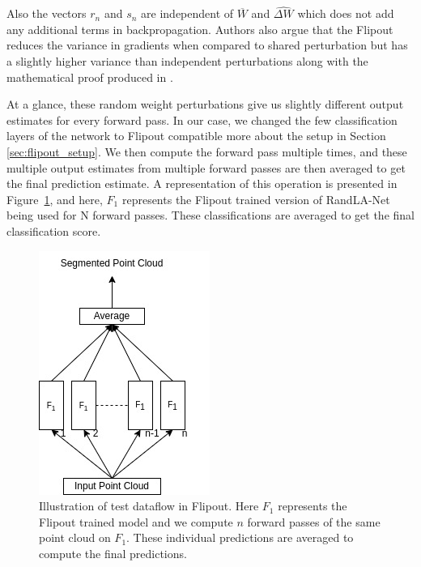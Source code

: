 Also the vectors $r_n$ and $s_n$ are independent of $\overline{W}$ and $\widehat{\Delta W}$ which does not add any additional terms in backpropagation.
Authors also argue that the Flipout reduces the variance in gradients when compared to shared perturbation but has a slightly higher variance than independent perturbations along with the mathematical proof produced in \cite{Flipout}.


At a glance, these random weight perturbations give us slightly different output estimates for every forward pass.
In our case, we changed the few classification layers of the network to Flipout compatible more about the setup in Section \ref{sec:flipout_setup}.
We then compute the forward pass multiple times, and these multiple output estimates from multiple forward passes are then averaged to get the final prediction estimate.
A representation of this operation is presented in Figure~\ref{fig:flipout_ex}, and here, $F_1$ represents the Flipout trained version of RandLA-Net being used for N forward passes.
These classifications are averaged to get the final classification score.

\begin{figure}
    \centering
    \includegraphics[scale=0.5]{images/flipout.jpg}
    \caption{Illustration of test dataflow in Flipout. Here $F_1$ represents the Flipout trained model and we compute $n$ forward passes of the same point cloud on $F_1$.
    These individual predictions are averaged to compute the final predictions.}
    \label{fig:flipout_ex}
\end{figure}
\FloatBarrier


